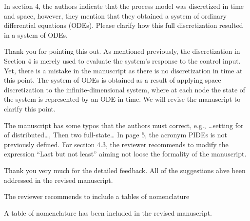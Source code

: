\documentclass[12pt,answers]{exam}
\begin{document}
\begin{questions}
    \question In section 4, the authors indicate that the process model was discretized in time and space, however, they mention that they obtained a system of ordinary differential equations (ODEs). Please clarify how this full discretization resulted in a system of ODEs.

    \begin{solutionorbox}
        Thank you for pointing this out. As mentioned previously, the discretization in Section 4 is merely used to evaluate the system's response to the control input. Yet, there is a mistake in the manuscript as there is no discretization in time at this point. The system of ODEs is obtained as a result of applying space discretization to the infinite-dimensional system, where at each node the state of the system is represented by an ODE in time. We will revise the manuscript to clarify this point.
    \end{solutionorbox}


    \question The manuscript has some typos that the authors must correct, e.g., …setting for of distributed…, Then two full-state… In page 5, the acronym PIDEs is not previously defined. For section 4.3, the reviewer recommends to modify the expression “Last but not least” aiming not loose the formality of the manuscript.

    \begin{solutionorbox}
        Thank you very much for the detailed feedback. All of the suggestions ahve been addressed in the revised manuscript.
    \end{solutionorbox}


    \question The reviewer recommends to include a tables of nomenclature

    \begin{solutionorbox}
        A table of nomenclature has been included in the revised manuscript.
    \end{solutionorbox}
\end{questions}


\newpage


\end{document}
